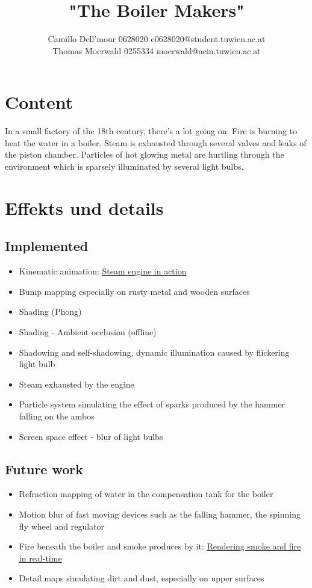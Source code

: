 \documentclass{scrartcl}
\title{"The Boiler Makers"}
\author{Camillo Dell'mour 0628020 e0628020@student.tuwien.ac.at\\ Thomas Moerwald 0255334 moerwald@acin.tuwien.ac.at}
\begin{document}
\maketitle

\section{Content}
In a small factory of the 18th century, there's a lot going on. Fire is burning to heat the water in a boiler. Steam is exhausted through several valves and leaks of the piston chamber. Particles of hot glowing metal are hurtling through the environment which is sparsely illuminated by several light bulbs.

\section{Effekts und details}
\subsection*{Implemented}
\begin{itemize}
	\item Kinematic animation: \href{http://en.wikipedia.org/wiki/File:Steam_engine_in_action.gif}{Steam engine in action}
	\item Bump mapping especially on rusty metal and wooden surfaces \cite{moeller1999realtime, dietrich2000hardware}
	\item Shading (Phong) \cite{phong1975illumination}
	\item Shading - Ambient occlusion (offline) \cite{hoberock2000high}
	\item Shadowing and self-shadowing, dynamic illumination caused by flickering light bulb \cite{nagy2000realtime, king2000ground}
	\item Steam exhausted by the engine \cite{van2000building}
	\item Particle system simulating the effect of sparks produced by the hammer falling on the ambos \cite{van2000building}
	\item Screen space effect - blur of light bulbs
\end{itemize}
\subsection*{Future work}
\begin{itemize}
	\item Refraction mapping of water in the compensation tank for the boiler \cite{vlachos2000refraction}
	\item Motion blur of fast moving devices such as the falling hammer, the spinning fly wheel and regulator \cite{rosado2007motion}
	\item Fire beneath the boiler and smoke produces by it: \href{http://graphics.ethz.ch/teaching/former/imagesynthesis_06/miniprojects/p3/index.html}{Rendering smoke and fire in real-time}
	\item Detail maps simulating dirt and dust, especially on upper surfaces
\end{itemize}

% 
 
\end{document}

